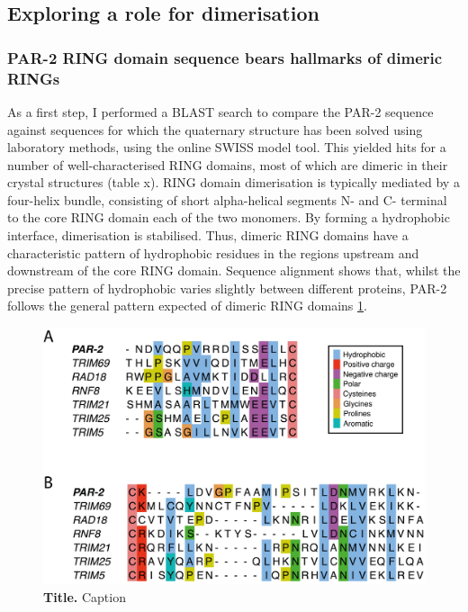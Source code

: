 \documentclass[12pt]{"article"}
\newcommand{\mycaption}[2]{\caption[#1]{\textbf{#1.} #2}}
\begin{document}
\clearpage
\subsection{Exploring a role for dimerisation}

\subsubsection{PAR-2 RING domain sequence bears hallmarks of dimeric RINGs}

As a first step, I performed a BLAST search to compare the PAR-2 sequence against sequences for which the quaternary structure has been solved using laboratory methods, using the online SWISS model tool. This yielded hits for a number of well-characterised RING domains, most of which are dimeric in their crystal structures (table x). RING domain dimerisation is typically mediated by a four-helix bundle, consisting of short alpha-helical segments N- and C- terminal to the core RING domain each of the two monomers. By forming a hydrophobic interface, dimerisation is stabilised. Thus, dimeric RING domains have a characteristic pattern of hydrophobic residues in the regions upstream and downstream of the core RING domain. Sequence alignment shows that, whilst the precise pattern of hydrophobic varies slightly between different proteins, PAR-2 follows the general pattern expected of dimeric RING domains \cref{fig:alignments_other_rings}.\\

\begin{figure}[!h]
\includegraphics[scale=1]{alignments_other_rings}
\setlength{\abovecaptionskip}{20pt}
\centering
\mycaption{Title}{Caption}
\label{fig:alignments_other_rings}
\end{figure}
\end{document}
